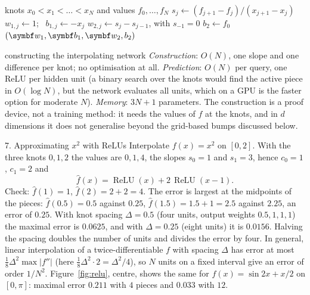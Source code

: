 \documentclass[11pt]{article}
\newcommand{\vb}{\vect{b}}
\newcommand{\relu}{\operatorname{ReLU}}
\begin{document}
\begin{algorithm}[htbp]
\caption{A one-hidden-layer ReLU network that interpolates given points}\label{alg:interp}
\begin{algorithmic}[1]
\Require knots $x_0 < x_1 < \dots < x_N$ and values $f_0, \dots, f_N$
    \State $s_j \gets (f_{j+1} - f_j)/(x_{j+1} - x_j)$ 
    \State $w_{1,j} \gets 1$; \ $b_{1,j} \gets -x_j$ 
    \State $w_{2,j} \gets s_j - s_{j-1}$, with $s_{-1} = 0$ 
  \EndFor
  \State $b_2 \gets f_0$
  \State \Return $(\vect{w}_1, \vb_1, \vect{w}_2, b_2)$ \Comment{$\hat f(x) = \sum_j w_{2,j}\relu(w_{1,j}x + b_{1,j}) + b_2$}
\EndFunction
\end{algorithmic}
\end{algorithm}

\begin{runtime}{constructing the interpolating network}
\emph{Construction}: $O(N)$, one slope and one difference per knot; no optimisation at all. \emph{Prediction}: $O(N)$
per query, one ReLU per hidden unit (a binary search over the knots would find the active piece in $O(\log N)$, but the
network evaluates all units, which on a GPU is the faster option for moderate $N$). \emph{Memory}: $3N + 1$
parameters. The construction is a proof device, not a training method: it needs the values of $f$ at the knots, and in
$d$ dimensions it does not generalise beyond the grid-based bumps discussed below.
\end{runtime}

\begin{worked}{7. Approximating $x^2$ with ReLUs}
Interpolate $f(x) = x^2$ on $[0, 2]$. With the three knots $0, 1, 2$ the values are $0, 1, 4$, the slopes $s_0 = 1$ and
$s_1 = 3$, hence $c_0 = 1$, $c_1 = 2$ and
\[
  \hat f(x) = \relu(x) + 2\,\relu(x - 1) .
\]
Check: $\hat f(1) = 1$, $\hat f(2) = 2 + 2 = 4$. The error is largest at the midpoints of the pieces: $\hat f(0.5) =
0.5$ against $0.25$, $\hat f(1.5) = 1.5 + 1 = 2.5$ against $2.25$, an error of $0.25$. With knot spacing $\Delta = 0.5$
(four units, output weights $0.5, 1, 1, 1$) the maximal error is $0.0625$, and with $\Delta = 0.25$ (eight units) it is
$0.0156$. Halving the spacing doubles the number of units and divides the error by four. In general, linear
interpolation of a twice-differentiable $f$ with spacing $\Delta$ has error at most $\frac18 \Delta^2\max|f''|$ (here
$\frac18 \Delta^2 \cdot 2 = \Delta^2/4$), so $N$ units on a fixed interval give an error of order $1/N^2$. Figure~\ref{fig:relu}, centre, shows
the same for $f(x) = \sin 2x + x/2$ on $[0, \pi]$: maximal error $0.211$ with $4$ pieces and $0.033$ with $12$.
\end{worked}
\end{document}
